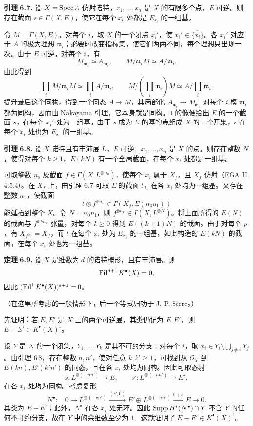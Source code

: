 \textbf{引理 6.7.} 设 \(X=\operatorname{Spec} A\) 仿射诺特，\(x_1,\ldots,x_n\) 是 \(X\) 的有限多个点，\(E\) 可逆。则存在截面 \(s\in \Gamma(X,E)\)，使它在每个 \(x_i\) 处都是 \(E_{x_i}\) 的一组基。

令 \(M=\Gamma(X,E)\)。对每个 \(i\)，取 \(X\) 的一个闭点 \(x_i'\)，使 \(x_i'\in\overline{\{x_i\}}\)。各 \(x_i'\) 对应于 \(A\) 的极大理想 \(\mathfrak m_i\)；必要时改变指标集，使它们两两不同，每个理想只出现一次。由于 \(E\) 可逆，对每个 \(i\)，有
\[
 M_{\mathfrak m_i}\simeq A_{\mathfrak m_i},
 \qquad M/\mathfrak m_iM\simeq A/\mathfrak m_i.
\]
由此得到
\[
 \prod_iM/\mathfrak m_iM\simeq\prod_i A/\mathfrak m_i,
 \qquad
 M/(\textstyle\prod_i\mathfrak m_i)M
 \simeq A/\textstyle\prod_i\mathfrak m_i.
\]
提升最后这个同构，得到一个同态 \(A\to M\)，其局部化 \(A_{\mathfrak m_i}\to M_{\mathfrak m_i}\) 对每个 \(i\) 模 \(\mathfrak m_i\) 都为同构，因而由 Nakayama 引理，它本身就是同构。\(1\) 的像便给出 \(E\) 的一个截面 \(s\)，在每个 \(x_i'\) 处为一组基。由于 \(s\) 成为 \(E\) 的基的点组成 \(X\) 的一个开集，\(s\) 在每个 \(x_i\) 处也为 \(E_{x_i}\) 的一组基。

\textbf{引理 6.8.} 设 \(X\) 诺特且有丰沛层 \(L\)，\(E\) 可逆，\(x_1,\ldots,x_n\) 是 \(X\) 的点。则存在整数 \(N\)，使得对每个 \(k\geq1\)，\(E(kN)\) 有一个全局截面，在每个 \(x_i\) 处都是一组基。

可取整数 \(n_0\) 及截面 \(f\in\Gamma(X,L^{\otimes n_0})\)，使每个 \(x_i\) 属于 \(X_f\)，且 \(X_f\) 仿射（EGA II 4.5.4）。在 \(X_f\) 上，由引理 6.7 可取 \(E\) 的截面 \(t\)，在各 \(x_i\) 处均为一组基。又存在整数 \(n_1\)，使截面
\[
 t\otimes f^{\otimes n_1}\in\Gamma(X_f,E(n_0n_1))
\]
能延拓到整个 \(X\)。令 \(N=n_0n_1\)，则 \(f^{\otimes n_1}\in\Gamma(X,L^{\otimes N})\)。将上面所得的 \(E(N)\) 的截面与 \(f^{\otimes kn_1}\) 张量，对每个 \(k\geq0\) 得到 \(E((k+1)N)\) 的截面。由于对每个 \(p\)，有 \(X_{f^{\otimes p}}=X_f\)，而 \(t\) 在每个 \(x_i\) 处为 \(E_{x_i}\) 的一组基，如此构造的 \(E(kN)\) 的截面，在每个 \(x_i\) 处也为一组基。

\textbf{定理 6.9.} 设 \(X\) 是维数为 \(d\) 的诺特概形，且有丰沛层。则
\[
  \operatorname{Fil}^{d+1}K^\bullet(X)=0,
\]
因此 \((\operatorname{Fil}^1K^\bullet(X))^{d+1}=0\)。

（在这里所考虑的一般情形下，后一个等式归功于 J.-P. Serre。）

先证明：若 \(E,E'\) 是 \(X\) 上的两个可逆层，其类仍记为 \(E,E'\)，则 \(E-E'\in K^\bullet(X)^1\)。

设 \(Y\) 是 \(X\) 的一个闭集，\(Y_1,\ldots,Y_k\) 是其不可约分支；对每个 \(i\)，取
\(x_i\in Y_i\setminus\bigcup_{j\ne i}Y_j\)。由引理 6.8，存在整数 \(n,n'\)，使对任意 \(k,k'\geq1\)，可找到从 \(\mathcal O_X\) 到 \(E(kn),E'(k'n')\) 的同态，且在各 \(x_i\) 处均为同构。因此可取态射
\[
 s:L^{\otimes(-nn')}\longrightarrow E,
 \qquad s':L^{\otimes(-nn')}\longrightarrow E',
\]
在各 \(x_i\) 处均为同构。考虑复形
\[
 N^\bullet:\quad
 0\longrightarrow L^{\otimes(-nn')}
 \xrightarrow{(s',0)} E'\oplus L^{\otimes(-nn')}
 \xrightarrow{0+s}E\longrightarrow0.
\]
其类为 \(E-E'\)；此外，\(N^\bullet\) 在各 \(x_i\) 处无环。因此 \(\operatorname{Supp} H^*(N^\bullet)\cap Y\) 不含 \(Y\) 的任何不可约分支，故在 \(Y\) 中的余维数至少为 \(1\)。这就证明了 \(E-E'\in K^\bullet(X)^1\)。

